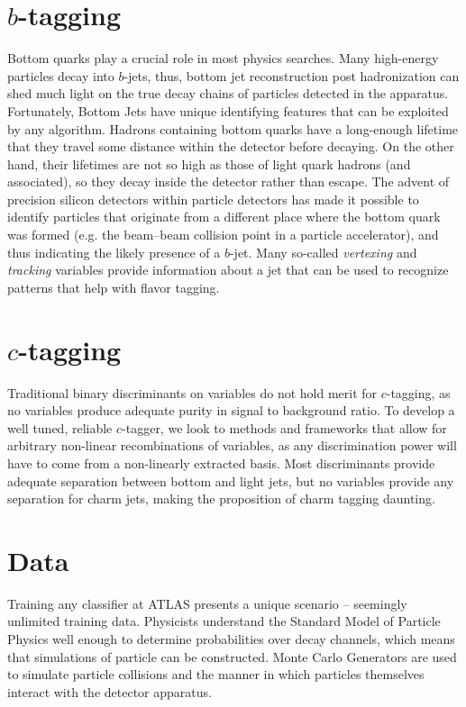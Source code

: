 \section{$b$-tagging}

Bottom quarks play a crucial role in most physics searches. Many high-energy particles decay into $b$-jets, thus, bottom jet reconstruction post hadronization can shed much light on the true decay chains of particles detected in the apparatus. Fortunately, Bottom Jets have unique identifying features that can be exploited by any algorithm. Hadrons containing bottom quarks have a long-enough lifetime that they travel some distance within the detector before decaying. On the other hand, their lifetimes are not so high as those of light quark hadrons (and associated), so they decay inside the detector rather than escape. The advent of precision silicon detectors within particle detectors has made it possible to identify particles that originate from a different place where the bottom quark was formed (e.g. the beam–beam collision point in a particle accelerator), and thus indicating the likely presence of a $b$-jet. Many so-called \textit{vertexing} and \emph{tracking} variables provide information about a jet that can be used to recognize patterns that help with flavor tagging.

\section{$c$-tagging}

Traditional binary discriminants on variables do not hold merit for $c$-tagging, as no variables produce adequate purity in signal to background ratio. To develop a well tuned, reliable $c$-tagger, we look to methods and frameworks that allow for arbitrary non-linear recombinations of variables, as any discrimination power will have to come from a non-linearly extracted basis. Most discriminants provide adequate separation between bottom and light jets, but no variables provide any separation for charm jets, making the proposition of charm tagging daunting.


\section{Data}
Training any classifier at ATLAS presents a unique scenario -- seemingly unlimited training data. Physicists understand the Standard Model of Particle Physics well enough to determine probabilities over decay channels, which means that simulations of particle can be constructed. Monte Carlo Generators are used to simulate particle collisions and the manner in which particles themselves interact with the detector apparatus. 

